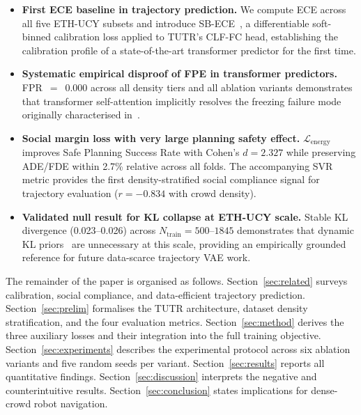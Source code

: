 \documentclass{article}
\begin{document}
\begin{itemize}

    \item \textbf{First ECE baseline in trajectory prediction.}
    We compute ECE across all five ETH-UCY subsets and introduce
    SB-ECE~\cite{karandikar2021soft}, a differentiable soft-binned
    calibration loss applied to TUTR's CLF-FC head, establishing the
    calibration profile of a state-of-the-art transformer predictor
    for the first time.

    \item \textbf{Systematic empirical disproof of FPE in transformer
    predictors.}
    FPR~$=$~0.000 across all density tiers and all ablation variants
    demonstrates that transformer self-attention implicitly resolves the
    freezing failure mode originally characterised
    in~\cite{trautman2010unfreezing}.

    \item \textbf{Social margin loss with very large planning safety
    effect.}
    $\mathcal{L}_{\mathrm{energy}}$ improves Safe Planning Success Rate
    with Cohen's $d = 2.327$ while preserving ADE/FDE within 2.7\%
    relative across all folds.
    The accompanying SVR metric provides the first density-stratified
    social compliance signal for trajectory evaluation
    ($r = -0.834$ with crowd density).

    \item \textbf{Validated null result for KL collapse at ETH-UCY
    scale.}
    Stable KL divergence (0.023--0.026) across
    $N_{\mathrm{train}} = 500$--$1845$ demonstrates that dynamic KL
    priors~\cite{zhang2025openworld} are unnecessary at this scale,
    providing an empirically grounded reference for future data-scarce
    trajectory VAE work.

\end{itemize}

The remainder of the paper is organised as follows.
Section~\ref{sec:related} surveys calibration, social compliance, and
data-efficient trajectory prediction.
Section~\ref{sec:prelim} formalises the TUTR architecture, dataset
density stratification, and the four evaluation metrics.
Section~\ref{sec:method} derives the three auxiliary losses and their
integration into the full training objective.
Section~\ref{sec:experiments} describes the experimental protocol
across six ablation variants and five random seeds per variant.
Section~\ref{sec:results} reports all quantitative findings.
Section~\ref{sec:discussion} interprets the negative and
counterintuitive results.
Section~\ref{sec:conclusion} states implications for dense-crowd robot
navigation.
\end{document}
